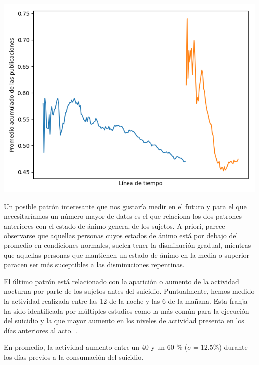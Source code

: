\documentclass[12pt, donotrepeattitle, jou]{apa6}
\begin{document}
    \begin{center}
        \begin{minipage}{0.65\linewidth}
            \includegraphics[width=\linewidth]{images/mix}
        \end{minipage}
    \end{center}

    Un posible patrón interesante que nos gustaría medir en el futuro y para el que necesitaríamos un número mayor de datos es el que relaciona los dos patrones anteriores con el estado de ánimo general de los sujetos. A priori, parece observarse que aquellas personas cuyos estados de ánimo está por debajo del promedio en condiciones normales, suelen tener la disminución gradual, mientras que aquellas personas que mantienen un estado de ánimo en la media o superior paracen ser más suceptibles a las disminuciones repentinas.
    
    El último patrón está relacionado con la aparición o aumento de la actividad nocturna por parte de los sujetos antes del suicidio. Puntualmente, hemos medido la actividad realizada entre las 12 de la noche y las 6 de la mañana. Esta franja ha sido identificada por múltiples estudios como la más común para la ejecución del suicidio y la que mayor aumento en los niveles de actividad presenta en los días anteriores al acto. \parencite{Season} \parencite{Littlewoode012113} \parencite{Sleeping} \parencite{PERLIS2016101}.
    
    En promedio, la actividad aumento entre un 40 y un 60 \% ($\sigma = 12.5\%$) durante los días previos a la consumación del suicidio.
    
\end{document}
